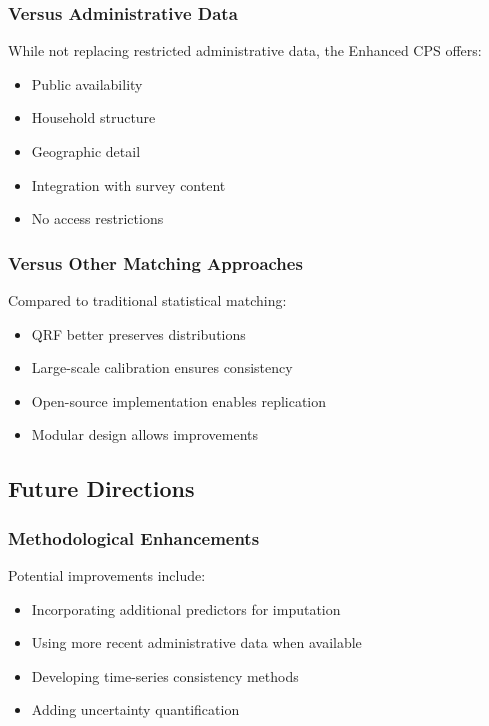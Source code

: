 \subsubsection{Versus Administrative Data}

While not replacing restricted administrative data, the Enhanced CPS offers:
\begin{itemize}
\item Public availability
\item Household structure
\item Geographic detail
\item Integration with survey content
\item No access restrictions
\end{itemize}

\subsubsection{Versus Other Matching Approaches}

Compared to traditional statistical matching:
\begin{itemize}
\item QRF better preserves distributions
\item Large-scale calibration ensures consistency
\item Open-source implementation enables replication
\item Modular design allows improvements
\end{itemize}

\subsection{Future Directions}

\subsubsection{Methodological Enhancements}

Potential improvements include:
\begin{itemize}
\item Incorporating additional predictors for imputation
\item Using more recent administrative data when available
\item Developing time-series consistency methods
\item Adding uncertainty quantification
\end{itemize}


